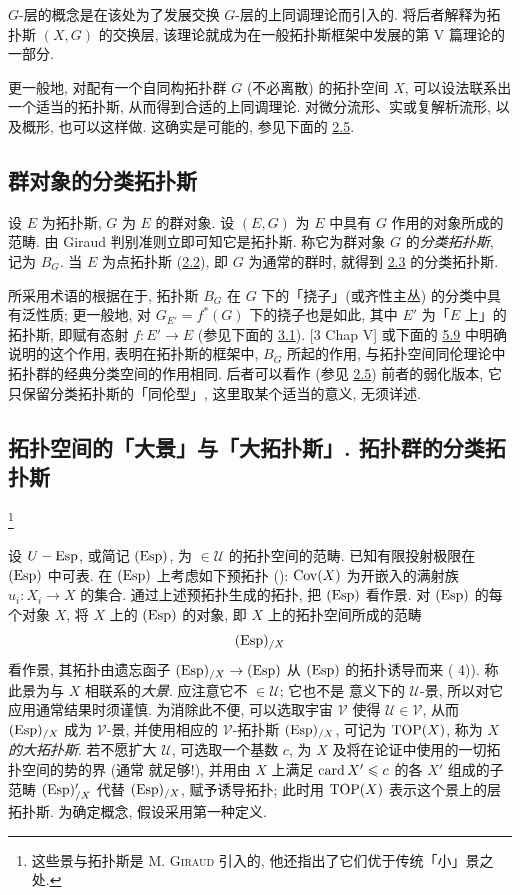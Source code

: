 $G$-层的概念是在该处为了发展交换 $G$-层的上同调理论而引入的. 将后者解释为拓扑斯 $(X,G)$ 的交换层, 该理论就成为在一般拓扑斯框架中发展的第 V 篇理论的一部分.

更\pageoriginale 一般地, 对配有一个自同构拓扑群 $G$ (不必离散) 的拓扑空间 $X$, 可以设法联系出一个适当的拓扑斯, 从而得到合适的上同调理论. 对微分流形、实或复解析流形, 以及概形, 也可以这样做. 这确实是可能的, 参见下面的 \hyperref[IV.subsec2.5]{2.5}.

\subsection{群对象的分类拓扑斯}

设 $E$ 为拓扑斯, $G$ 为 $E$ 的群对象. 设 $(E,G)$ 为 $E$ 中具有 $G$ 作用的对象所成的范畴. 由 Giraud 判别准则立即可知它是拓扑斯. 称它为群对象 $G$ 的\emph{分类拓扑斯}, 记为 $B_G$. 当 $E$ 为点拓扑斯 (\hyperref[IV.subsec2.2]{2.2}), 即 $G$ 为通常的群时, 就得到 \hyperref[IV.subsec2.3]{2.3} 的分类拓扑斯.

所采用术语的根据在于, 拓扑斯 $B_G$ 在 $G$ 下的「挠子」(或齐性主丛) 的分类中具有泛性质; 更一般地, 对 $G_{E'}=f^{\ast}(G)$ 下的挠子也是如此, 其中 $E'$ 为「$E$ 上」的拓扑斯, 即赋有态射 $f:E'\rightarrow E$ (参见下面的 \hyperref[IV.def3.1]{3.1}). [3 Chap V] 或下面的 \hyperref[IV.exer5.9]{5.9} 中明确说明的这个作用, 表明在拓扑斯的框架中, $B_G$ 所起的作用, 与拓扑空间同伦理论中拓扑群的经典分类空间的作用相同. 后者可以看作 (参见 \hyperref[IV.subsec2.5]{2.5}) 前者的弱化版本, 它只保留分类拓扑斯的「同伦型」, 这里取某个适当的意义, 无须详述.

\subsection{拓扑空间的「大景」与「大拓扑斯」. 拓扑群的分类拓扑斯}\footnote[1]{这些景与拓扑斯是 M. \textsc{Giraud} 引入的, 他还指出了它们优于传统「小」景之处.}\pageoriginale

设 $U-\operatorname{Esp}$, 或简记 $(\operatorname{Esp})$, 为 $\in 𝒰$ 的拓扑空间的范畴. 已知有限投射极限在 $(\operatorname{Esp})$ 中可表. 在 $(\operatorname{Esp})$ 上考虑如下预拓扑 (): $\operatorname{Cov}(X)$ 为开嵌入的满射族 $u_i:X_i\rightarrow X$ 的集合. 通过上述预拓扑生成的拓扑, 把 $(\operatorname{Esp})$ 看作景. 对 $(\operatorname{Esp})$ 的每个对象 $X$, 将 $X$ 上的 $(\operatorname{Esp})$ 的对象, 即 $X$ 上的拓扑空间所成的范畴
$$
(\operatorname{Esp})_{/X}
$$
看作景, 其拓扑由遗忘函子 $(\operatorname{Esp})_{/X}\rightarrow (\operatorname{Esp})$ 从 $(\operatorname{Esp})$ 的拓扑诱导而来 ( 4)). 称此景为与 $X$ 相联系的\emph{大景}. 应注意它不 $\in 𝒰$; 它也不是  意义下的 $𝒰$-景, 所以对它应用通常结果时须谨慎. 为消除此不便, 可以选取宇宙 $𝒱$ 使得 $𝒰\in 𝒱$, 从而 $(\operatorname{Esp})_{/X}$ 成为 $𝒱$-景, 并使用相应的 $𝒱$-拓扑斯 $(\operatorname{Esp})_{/X}$, 可记为 $\operatorname{TOP}(X)$, 称为 \emph{$X$ 的大拓扑斯}. 若不愿扩大 $𝒰$, 可选取一个基数 $c$, 为 $X$ 及将在论证中使用的一切拓扑空间的势的界 (通常  就足够!), 并用由 $X$ 上满足 $\operatorname{card} X'\leqslant c$ 的各 $X'$ 组成的子范畴 $(\operatorname{Esp})'_{/X}$ 代替 $(\operatorname{Esp})_{/X}$, 赋予诱导拓扑; 此时用 $\operatorname{TOP}(X)$ 表示这个\pageoriginale 景上的层拓扑斯. 为确定概念, 假设采用第一种定义.

